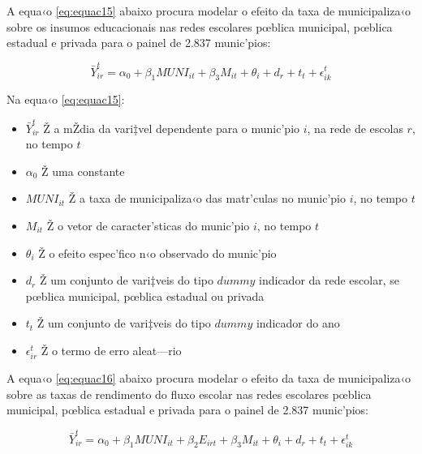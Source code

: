 \documentclass[a4paper, 12pt]{article}
\begin{document}

\vspace*{0.5cm} 




A equa‹o  \ref{eq:equac15} abaixo procura modelar  o efeito da taxa de municipaliza‹o sobre os insumos educacionais nas redes escolares pœblica municipal, pœblica estadual e privada para o painel de 2.837 munic’pios: 

\begin{equation}
\bar Y_{ir}^{t} = \alpha_0 + \beta_1 MUNI_{it}   + \beta_3 M_{it}  + \theta_{i}  +  d_{r} + t_{t} + \epsilon_{ik}^{t} \label{eq:equac15}
\end{equation}

Na equa‹o \ref{eq:equac15}:
\begin{itemize}
\item $\bar Y_{ir}^{t}$ Ž a mŽdia da vari‡vel dependente para o munic’pio $i$, na rede de escolas $r$, no tempo $t$
\item$\alpha_0$ Ž uma constante
\item$MUNI_{it}$ Ž a taxa de municipaliza‹o das matr’culas no munic’pio $i$, no tempo $t$
\item$M_{it}$ Ž o vetor de caracter’sticas do munic’pio $i$, no tempo $t$
\item$\theta_{i}$ Ž o efeito espec’fico n‹o observado do munic’pio
\item$d_{r}$ Ž um conjunto de vari‡veis do tipo $dummy$ indicador da rede escolar, se pœblica municipal, pœblica estadual ou privada
\item$t_{t}$ Ž um conjunto de vari‡veis do tipo $dummy$ indicador do ano
\item$\epsilon_{ir}^{t}$ Ž o termo de erro aleat—rio 
\end{itemize}
 




A equa‹o  \ref{eq:equac16} abaixo procura modelar  o efeito da taxa de municipaliza‹o sobre as taxas de rendimento do fluxo escolar nas redes escolares pœblica municipal, pœblica estadual e privada para o painel de 2.837 munic’pios: 

\begin{equation}
\bar Y_{ir}^{t} = \alpha_0 + \beta_1 MUNI_{it}  + \beta_2 E_{irt} + \beta_3 M_{it}  + \theta_{i}  +  d_{r} + t_{t} + \epsilon_{ik}^{t} \label{eq:equac16}
\end{equation}
\end{document}
